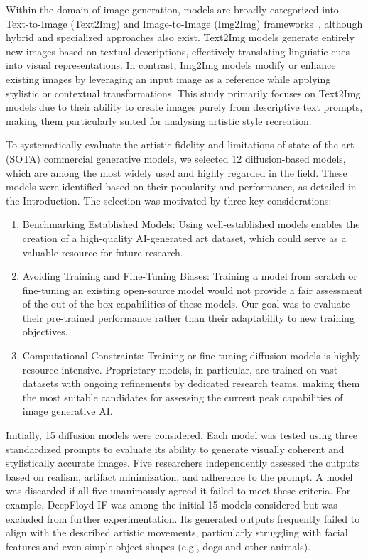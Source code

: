 \documentclass[sn-mathphys]{sn-jnl}
\begin{document}
Within the domain of image generation, models are broadly categorized into Text-to-Image (Text2Img) and Image-to-Image (Img2Img) frameworks~\cite{instruct_pix2pix_i2i, img2img_turbo_i2i}, although hybrid and specialized approaches also exist. Text2Img models generate entirely new images based on textual descriptions, effectively translating linguistic cues into visual representations. In contrast, Img2Img models modify or enhance existing images by leveraging an input image as a reference while applying stylistic or contextual transformations. This study primarily focuses on Text2Img models due to their ability to create images purely from descriptive text prompts, making them particularly suited for analysing artistic style recreation.

To systematically evaluate the artistic fidelity and limitations of state-of-the-art (SOTA) commercial generative models, we selected 12 diffusion-based models, which are among the most widely used and highly regarded in the field. These models were identified based on their popularity and performance, as detailed in the Introduction. The selection was motivated by three key considerations:
\begin{enumerate}
    \item Benchmarking Established Models: Using well-established models enables the creation of a high-quality AI-generated art dataset, which could serve as a valuable resource for future research.
    \item Avoiding Training and Fine-Tuning Biases: Training a model from scratch or fine-tuning an existing open-source model would not provide a fair assessment of the out-of-the-box capabilities of these models. Our goal was to evaluate their pre-trained performance rather than their adaptability to new training objectives.
    \item Computational Constraints: Training or fine-tuning diffusion models is highly resource-intensive. Proprietary models, in particular, are trained on vast datasets with ongoing refinements by dedicated research teams, making them the most suitable candidates for assessing the current peak capabilities of image generative AI.
\end{enumerate}

Initially, 15 diffusion models were considered. 
Each model was tested using three standardized prompts to evaluate its ability to generate visually coherent and stylistically accurate images. Five researchers independently assessed the outputs based on realism, artifact minimization, and adherence to the prompt. A model was discarded if all five unanimously agreed it failed to meet these criteria.
For example, DeepFloyd IF \cite{stabilityai2023} was among the initial 15 models considered but was excluded from further experimentation. Its generated outputs frequently failed to align with the described artistic movements, particularly struggling with facial features and even simple object shapes (e.g., dogs and other animals).
\end{document}
